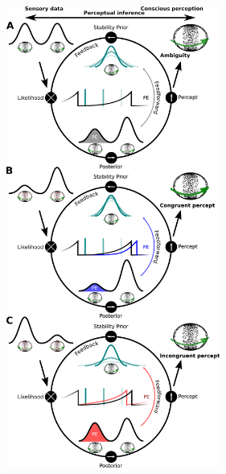 \documentclass[12pt]{article}
\begin{document}
\clearpage
\begin{figure}[h]
\begin{center}
\includegraphics[width=7cm]{Figure_4.png}
\end{center}
\end{figure}
\end{document}
